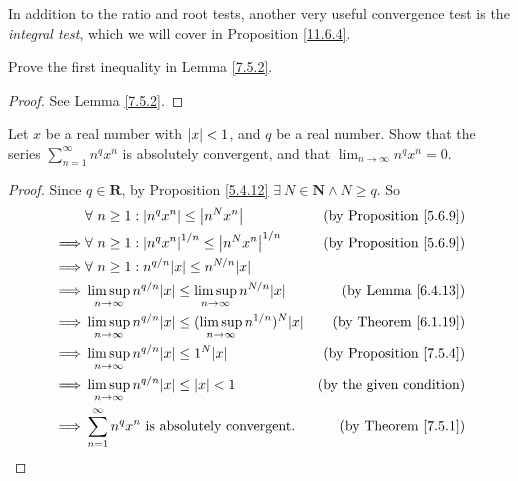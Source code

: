 \begin{remark}\label{7.5.5}
    In addition to the ratio and root tests, another very useful convergence test is the \emph{integral test}, which we will cover in Proposition \ref{11.6.4}.
\end{remark}

\exercisesection

\begin{exercise}\label{ex 7.5.1}
    Prove the first inequality in Lemma \ref{7.5.2}.
\end{exercise}

\begin{proof}
    See Lemma \ref{7.5.2}.
\end{proof}

\begin{exercise}\label{ex 7.5.2}
    Let \(x\) be a real number with \(\abs*{x} < 1\), and \(q\) be a real number.
    Show that the series \(\sum_{n = 1}^\infty n^q x^n\) is absolutely convergent, and that \(\lim_{n \to \infty} n^q x^n = 0\).
\end{exercise}

\begin{proof}
    Since \(q \in \mathbf{R}\), by Proposition \ref{5.4.12} \(\exists\ N \in \mathbf{N} \land N \geq q\).
    So
    \begin{align*}
                 & \forall\ n \geq 1 : \abs*{n^q x^n} \leq \abs*{n^N x^n}                                       & \text{(by Proposition \ref{5.6.9})} \\
        \implies & \forall\ n \geq 1 : \abs*{n^q x^n}^{1 / n} \leq \abs*{n^N x^n}^{1 / n}                       & \text{(by Proposition \ref{5.6.9})} \\
        \implies & \forall\ n \geq 1 : n^{q / n} \abs*{x} \leq n^{N / n} \abs*{x}                                                                     \\
        \implies & \limsup_{n \to \infty} n^{q / n} \abs*{x} \leq \limsup_{n \to \infty} n^{N / n} \abs*{x}     & \text{(by Lemma \ref{6.4.13})}      \\
        \implies & \limsup_{n \to \infty} n^{q / n} \abs*{x} \leq (\limsup_{n \to \infty} n^{1 / n})^N \abs*{x} & \text{(by Theorem \ref{6.1.19})}    \\
        \implies & \limsup_{n \to \infty} n^{q / n} \abs*{x} \leq 1^N \abs*{x}                                  & \text{(by Proposition \ref{7.5.4})} \\
        \implies & \limsup_{n \to \infty} n^{q / n} \abs*{x} \leq \abs*{x} < 1                                  & \text{(by the given condition)}     \\
        \implies & \sum_{n = 1}^\infty n^q x^n \text{ is absolutely convergent}.                                & \text{(by Theorem \ref{7.5.1})}
    \end{align*}
\end{proof}

